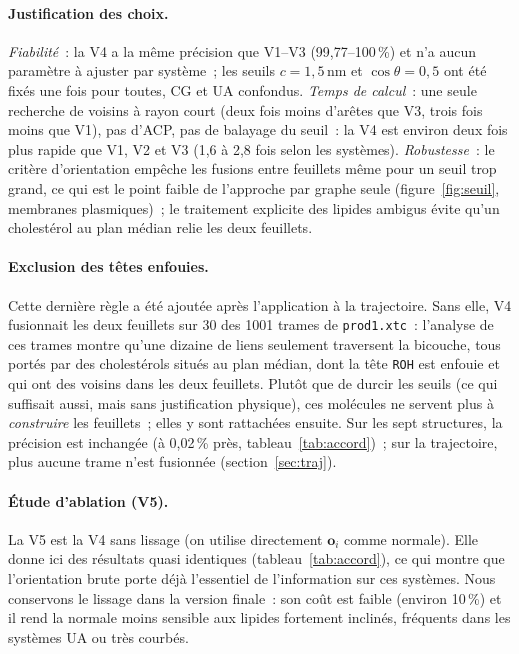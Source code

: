 \documentclass[11pt,a4paper]{article}
\begin{document}
\paragraph{Justification des choix.}
\emph{Fiabilité}~: la V4 a la même précision que V1--V3 (99,77--100\,\%) et n'a aucun paramètre à ajuster par système~;
les seuils $c=1{,}5$\,nm et $\cos\theta=0{,}5$ ont été fixés une fois pour toutes, CG et UA confondus.
\emph{Temps de calcul}~: une seule recherche de voisins à rayon court (deux fois moins d'arêtes que V3, trois fois
moins que V1), pas d'ACP, pas de balayage du seuil~: la V4 est environ deux fois plus rapide que V1, V2 et V3 (1,6 à
2,8 fois selon les systèmes).
\emph{Robustesse}~: le critère d'orientation empêche les fusions entre feuillets même pour un seuil trop grand,
ce qui est le point faible de l'approche par graphe seule (figure~\ref{fig:seuil}, membranes plasmiques)~; le
traitement explicite des lipides ambigus évite qu'un cholestérol au plan médian relie les deux feuillets.

\paragraph{Exclusion des têtes enfouies.} Cette dernière règle a été ajoutée après l'application à la trajectoire.
Sans elle, V4 fusionnait les deux feuillets sur 30 des 1001 trames de \texttt{prod1.xtc}~: l'analyse de ces trames
montre qu'une dizaine de liens seulement traversent la bicouche, tous portés par des cholestérols situés au plan
médian, dont la tête \texttt{ROH} est enfouie et qui ont des voisins dans les deux feuillets. Plutôt que de durcir
les seuils (ce qui suffisait aussi, mais sans justification physique), ces molécules ne servent plus à
\emph{construire} les feuillets~; elles y sont rattachées ensuite. Sur les sept structures, la précision est
inchangée (à 0,02\,\% près, tableau~\ref{tab:accord})~; sur la trajectoire, plus aucune trame n'est fusionnée
(section~\ref{sec:traj}).

\paragraph{Étude d'ablation (V5).} La V5 est la V4 sans lissage (on utilise directement $\mathbf o_i$ comme
normale). Elle donne ici des résultats quasi identiques (tableau~\ref{tab:accord}), ce qui montre que
l'orientation brute porte déjà l'essentiel de l'information sur ces systèmes. Nous conservons le lissage dans la
version finale~: son coût est faible (environ 10\,\%) et il rend la normale moins sensible aux lipides
fortement inclinés, fréquents dans les systèmes UA ou très courbés.
\end{document}
